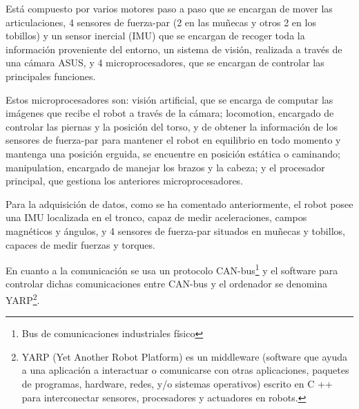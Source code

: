 
Está compuesto por varios motores paso a paso que se encargan de mover las articulaciones, 4 sensores de fuerza-par (2 en las muñecas y otros 2 en los tobillos) y un sensor inercial (IMU) que se encargan de recoger toda la información proveniente del entorno, un sistema de visión, realizada a través de una cámara ASUS, y 4 microprocesadores, que se encargan de controlar las principales funciones.

Estos microprocesadores son: visión artificial, que se encarga de computar las imágenes que recibe el robot a través de la cámara; locomotion, encargado de controlar las piernas y la posición del torso, y de obtener la información de los sensores de fuerza-par para mantener el robot en equilibrio en todo momento y mantenga una posición erguida, se encuentre en posición estática o caminando; manipulation, encargado de manejar los brazos y la cabeza; y el procesador principal, que gestiona los anteriores microprocesadores. 

Para la adquisición de datos, como se ha comentado anteriormente, el robot posee una IMU localizada en el tronco, capaz de medir aceleraciones, campos magnéticos y ángulos,  y 4 sensores de fuerza-par situados en muñecas y tobillos, capaces de medir fuerzas y torques.

En cuanto a la comunicación se usa un protocolo CAN-bus\footnote{Bus de comunicaciones industriales físico} y el software para controlar dichas comunicaciones entre CAN-bus y el ordenador se denomina YARP\footnote{YARP (Yet Another Robot Platform) es un middleware (software que ayuda a una aplicación a interactuar o comunicarse con otras aplicaciones, paquetes de programas, hardware, redes, y/o sistemas operativos) escrito en C ++ para interconectar sensores, procesadores y actuadores en robots.}.

